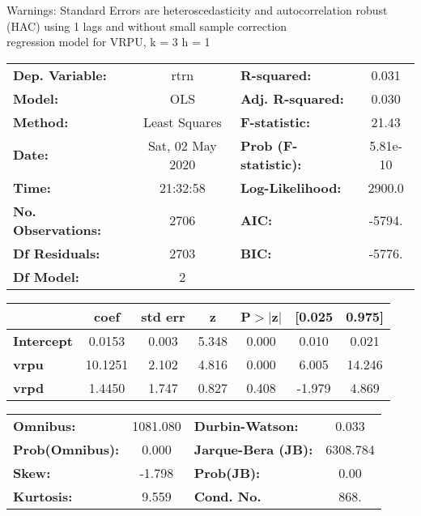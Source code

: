 Warnings: \newline
 [1] Standard Errors are heteroscedasticity and autocorrelation robust (HAC) using 1 lags and without small sample correction\\ 

regression model for VRPU, k = 3 h = 1\begin{center}
\begin{tabular}{lclc}
\toprule
\textbf{Dep. Variable:}    &       rtrn       & \textbf{  R-squared:         } &     0.031   \\
\textbf{Model:}            &       OLS        & \textbf{  Adj. R-squared:    } &     0.030   \\
\textbf{Method:}           &  Least Squares   & \textbf{  F-statistic:       } &     21.43   \\
\textbf{Date:}             & Sat, 02 May 2020 & \textbf{  Prob (F-statistic):} &  5.81e-10   \\
\textbf{Time:}             &     21:32:58     & \textbf{  Log-Likelihood:    } &    2900.0   \\
\textbf{No. Observations:} &        2706      & \textbf{  AIC:               } &    -5794.   \\
\textbf{Df Residuals:}     &        2703      & \textbf{  BIC:               } &    -5776.   \\
\textbf{Df Model:}         &           2      & \textbf{                     } &             \\
\bottomrule
\end{tabular}
\begin{tabular}{lcccccc}
                   & \textbf{coef} & \textbf{std err} & \textbf{z} & \textbf{P$> |$z$|$} & \textbf{[0.025} & \textbf{0.975]}  \\
\midrule
\textbf{Intercept} &       0.0153  &        0.003     &     5.348  &         0.000        &        0.010    &        0.021     \\
\textbf{vrpu}      &      10.1251  &        2.102     &     4.816  &         0.000        &        6.005    &       14.246     \\
\textbf{vrpd}      &       1.4450  &        1.747     &     0.827  &         0.408        &       -1.979    &        4.869     \\
\bottomrule
\end{tabular}
\begin{tabular}{lclc}
\textbf{Omnibus:}       & 1081.080 & \textbf{  Durbin-Watson:     } &    0.033  \\
\textbf{Prob(Omnibus):} &   0.000  & \textbf{  Jarque-Bera (JB):  } & 6308.784  \\
\textbf{Skew:}          &  -1.798  & \textbf{  Prob(JB):          } &     0.00  \\
\textbf{Kurtosis:}      &   9.559  & \textbf{  Cond. No.          } &     868.  \\
\bottomrule
\end{tabular}
\end{center}

